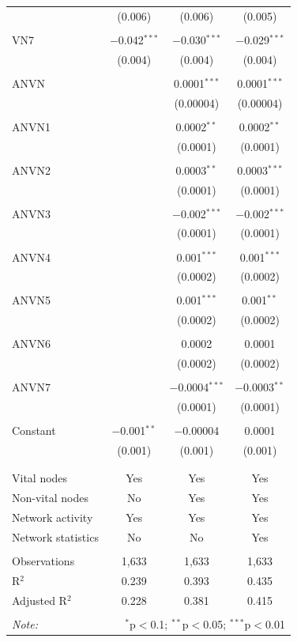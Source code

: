 \begin{table}[!htbp]
\begin{tabular}{@{\extracolsep{5pt}}lccc}
  & (0.006) & (0.006) & (0.005) \\ 
  & & & \\ 
 VN7 & $-$0.042$^{***}$ & $-$0.030$^{***}$ & $-$0.029$^{***}$ \\ 
  & (0.004) & (0.004) & (0.004) \\ 
  & & & \\ 
 ANVN &  & 0.0001$^{***}$ & 0.0001$^{***}$ \\ 
  &  & (0.00004) & (0.00004) \\ 
  & & & \\ 
 ANVN1 &  & 0.0002$^{**}$ & 0.0002$^{**}$ \\ 
  &  & (0.0001) & (0.0001) \\ 
  & & & \\ 
 ANVN2 &  & 0.0003$^{**}$ & 0.0003$^{***}$ \\ 
  &  & (0.0001) & (0.0001) \\ 
  & & & \\ 
 ANVN3 &  & $-$0.002$^{***}$ & $-$0.002$^{***}$ \\ 
  &  & (0.0001) & (0.0001) \\ 
  & & & \\ 
 ANVN4 &  & 0.001$^{***}$ & 0.001$^{***}$ \\ 
  &  & (0.0002) & (0.0002) \\ 
  & & & \\ 
 ANVN5 &  & 0.001$^{***}$ & 0.001$^{**}$ \\ 
  &  & (0.0002) & (0.0002) \\ 
  & & & \\ 
 ANVN6 &  & 0.0002 & 0.0001 \\ 
  &  & (0.0002) & (0.0002) \\ 
  & & & \\ 
 ANVN7 &  & $-$0.0004$^{***}$ & $-$0.0003$^{**}$ \\ 
  &  & (0.0001) & (0.0001) \\ 
  & & & \\ 
 Constant & $-$0.001$^{**}$ & $-$0.00004 & 0.0001 \\ 
  & (0.001) & (0.001) & (0.001) \\ 
  & & & \\ 
\hline \\[-1.8ex] 
Vital nodes & Yes & Yes & Yes \\ 
Non-vital nodes & No & Yes & Yes \\ 
Network activity & Yes & Yes & Yes \\ 
Network statistics & No & No & Yes \\ 
\hline &  &  &  \\ 
Observations & 1,633 & 1,633 & 1,633 \\ 
R$^{2}$ & 0.239 & 0.393 & 0.435 \\ 
Adjusted R$^{2}$ & 0.228 & 0.381 & 0.415 \\ 
\hline 
\hline \\[-1.8ex] 
\textit{Note:}  & \multicolumn{3}{r}{$^{*}$p$<$0.1; $^{**}$p$<$0.05; $^{***}$p$<$0.01} \\ 
\end{tabular} 
\end{table} 
